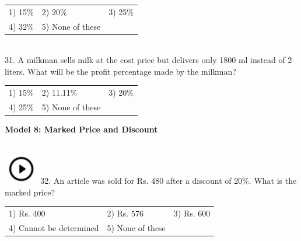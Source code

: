 \documentclass{article}
\begin{document}
	\noindent \begin{tabular}{p{1.7in} p{1.6in} p{1.6in}} \\ 
 1) 15\%                    & 2) 20\%              & 3) 25\%              \\
4) 32\%              & 5) None of these \\
\end{tabular}
	
	\noindent 
	
	\noindent 
	
	\noindent 
	
	\noindent  \\ 31. A milkman sells milk at the cost price but delivers only 1800 ml instead of 2 liters. What will be the profit percentage made by the milkman?
	
	\noindent \begin{tabular}{p{1.7in} p{1.6in} p{1.6in}} \\ 
 1) 15\%                    & 2) 11.11\%         & 3) 20\%              \\
4) 25\%              & 5) None of these \\
\end{tabular}
	
	\noindent 
	
	\noindent 
	
	\noindent 
	
	\noindent 
	\newpage
	\noindent \textbf{Model 8: Marked Price and Discount}
	
	\noindent 
	
	\noindent \\  \includegraphics*[width=0.59in, height=0.52in]{images/image1}
	32. An article was sold for Rs. 480 after a discount of 20\%. What is the marked price?
	
	\noindent 
	
	\begin{tabular}{p{2.0in} p{1.4in} p{0.7in}} 

 1) Rs. 400 & 2) Rs. 576 & 3) Rs. 600 \\  
		
4) Cannot be determined & 5) None of these &  \\  
	\end{tabular}
	
	
	
	\noindent 
	
\end{document}
